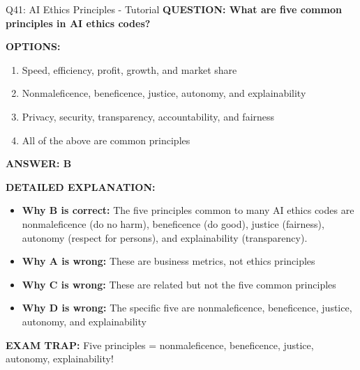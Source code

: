 \documentclass[8pt]{beamer}
\begin{document}
	\begin{frame}{Q41: AI Ethics Principles - Tutorial}
		\fontsize{6.5}{7.5}\selectfont
		\textbf{QUESTION: What are five common principles in AI ethics codes?}
		
		\vspace{0.1cm}
		\textbf{OPTIONS:}
		\begin{enumerate}
			\item Speed, efficiency, profit, growth, and market share
			\item Nonmaleficence, beneficence, justice, autonomy, and explainability
			\item Privacy, security, transparency, accountability, and fairness
			\item All of the above are common principles
		\end{enumerate}
		
		\vspace{0.1cm}
		\textcolor{myblue}{\textbf{ANSWER: B}}
		
		\vspace{0.1cm}
		\textbf{DETAILED EXPLANATION:}
		\begin{itemize}
			\item \textbf{Why B is correct:} The five principles common to many AI ethics codes are nonmaleficence (do no harm), beneficence (do good), justice (fairness), autonomy (respect for persons), and explainability (transparency).
			\item \textbf{Why A is wrong:} These are business metrics, not ethics principles
			\item \textbf{Why C is wrong:} These are related but not the five common principles
			\item \textbf{Why D is wrong:} The specific five are nonmaleficence, beneficence, justice, autonomy, and explainability
		\end{itemize}
		
		\textcolor{myred}{\textbf{EXAM TRAP:}} Five principles = \textcolor{myblue}{nonmaleficence, beneficence, justice, autonomy, explainability}!
	\end{frame}
	
\end{document}

